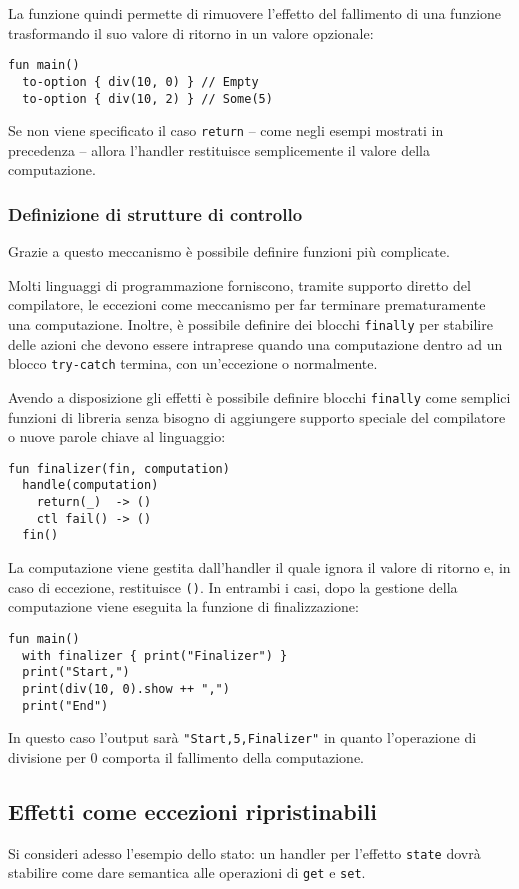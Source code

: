 La funzione quindi permette di rimuovere l'effetto del fallimento di una funzione trasformando il suo valore di ritorno in un valore opzionale:
\begin{lstlisting}[language=koka]
fun main()
  to-option { div(10, 0) } // Empty
  to-option { div(10, 2) } // Some(5)
\end{lstlisting}

Se non viene specificato il caso \lstinline{return} -- come negli esempi mostrati in precedenza -- allora l'handler restituisce semplicemente il valore della computazione.

\subsubsection{Definizione di strutture di controllo}
Grazie a questo meccanismo è possibile definire funzioni più complicate.

Molti linguaggi di programmazione forniscono, tramite supporto diretto del compilatore, le eccezioni come meccanismo per far terminare prematuramente una computazione.
Inoltre, è possibile definire dei blocchi \lstinline{finally} per stabilire delle azioni che devono essere intraprese quando una computazione dentro ad un blocco \lstinline{try-catch} termina, con un'eccezione o normalmente.

Avendo a disposizione gli effetti è possibile definire blocchi \lstinline{finally} come semplici funzioni di libreria senza bisogno di aggiungere supporto speciale del compilatore o nuove parole chiave al linguaggio:
\begin{lstlisting}[language=koka]
fun finalizer(fin, computation)
  handle(computation)
    return(_)  -> ()
    ctl fail() -> ()
  fin()
\end{lstlisting}
La computazione viene gestita dall'handler il quale ignora il valore di ritorno e, in caso di eccezione, restituisce \lstinline{()}. In entrambi i casi, dopo la gestione della computazione viene eseguita la funzione di finalizzazione:
\begin{lstlisting}[language=koka]
fun main()
  with finalizer { print("Finalizer") }
  print("Start,")
  print(div(10, 0).show ++ ",")
  print("End")
\end{lstlisting}
In questo caso l'output sarà \lstinline{"Start,5,Finalizer"} in quanto l'operazione di divisione per 0 comporta il fallimento della computazione.

\subsection{Effetti come eccezioni ripristinabili}
Si consideri adesso l'esempio dello stato: un handler per l'effetto \lstinline{state} dovrà stabilire come dare semantica alle operazioni di \lstinline{get} e \lstinline{set}.

